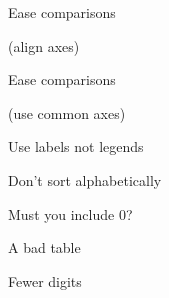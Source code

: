\documentclass[aspectratio=169,12pt,t]{beamer}
\begin{document}
\begin{frame}{Ease comparisons}

{\hilit (align axes)}


\note{
}
\end{frame}




\begin{frame}{Ease comparisons}

{\hilit (use common axes)}


\note{
}
\end{frame}







\begin{frame}[c]{Use labels not legends}


\note{
}
\end{frame}





\begin{frame}[c]{Don't sort alphabetically}


\note{
}
\end{frame}





\begin{frame}[c]{Must you include 0?}


\note{
}
\end{frame}




\begin{frame}[c]{A bad table}


\note{
}
\end{frame}


\begin{frame}[c]{Fewer digits}


\note{
}
\end{frame}
\end{document}
